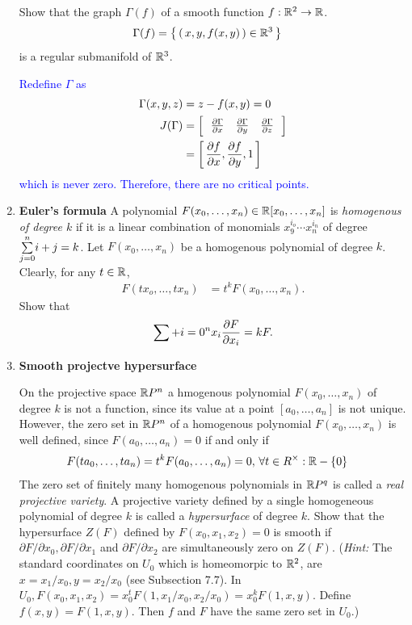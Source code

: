 \documentclass[12pt,a4paper]{report}
\newcommand{\BLUE}[1]{\textcolor{blue}{#1}}
\begin{document}
\begin{enumerate}[label=9.\arabic*.]
Show that the graph $\Gamma(f)$ of a smooth function $f: \mathbb{R}^2\to \mathbb{R}$.
\begin{align*}
	\Gamma(f) &= \left \{\, \left (\, x,y,f(x,y) \,\right ) \in \mathbb{R}^3 \,\right \}
\end{align*}is a regular submanifold of $\mathbb{R}^3$.

\BLUE{Redefine $\Gamma$ as \begin{align*}
	\Gamma(x,y,z) &= z-f(x,y) = 0\\
	J(\Gamma) &= \left [\, \begin{array}{ccc}
		\frac{\partial \Gamma}{\partial x} & \frac{\partial \Gamma}{\partial y} & \frac{\partial \Gamma}{\partial z}
	\end{array}
	 \,\right ] \\
		&= \left [\, \frac{\partial f}{\partial x},\frac{\partial f}{\partial y},1 \,\right ]
\end{align*}which is never zero.  Therefore, there are no critical points.
}

\item \textbf{Euler's formula}
A polynomial $F(x_0,\dots,x_n) \in \mathbb{R}[x_0,\dots,x_n]$ is \textit{homogenous of degree $k$} if it is a linear combination of monomials $x_9^{i_o}\cdots x_n^{i_n}$ of degree $\underset{j=0}{\overset{n}{\sum}}i+j = k$.  Let $F(x_0,\dots,x_n)$ be a homogenous polynomial of degree $k$.  Clearly, for any $t \in \mathbb{R}$,
\begin{align*}
	F(tx_o,\dots,tx_n) &= t^kF(x_0,\dots, x_n).
\end{align*}Show that
\begin{align*}
	\sum+{i=0}^n x_i\frac{\partial F}{\partial x_i} = kF.
\end{align*}

\item \textbf{Smooth projectve hypersurface}

On the projective space $\mathbb{R} P^n$ a hmogenous polynomial $F(x_0,\dots,x_n)$ of degree $k$ is not a function, since its value at a point $[a_0,\dots,a_n]$ is not unique.  However, the zero set in $\mathbb{R} P^n$ of a homogenous polynomial $F(x_0,\dots,x_n)$ is well defined, since $F(a_0,\dots,a_n)=0$ if and only if 
\begin{align*}
	F(ta_0,\dots,ta_n) &= t^kF(a_0,\dots,a_n)=0,\, \forall t \in R^\times: \mathbb{R}-\{0\}
\end{align*}The zero set of finitely many homogenous polynomials in $\mathbb{R} P^q$ is called a \textit{real projective variety}.  A projective variety defined by a single homogeneous polynomial of degree $k$ is called a \textit{hypersurface} of degree $k$.  Show that the hypersurface $Z(F)$ defined by $F(x_0,x_1,x_2)=0$ is smooth if $\partial F/\partial x_0, \partial F/\partial x_1$ and $\partial F/\partial x_2$ are simultaneously zero on $Z(F)$.  (\textit{Hint:} The standard coordinates on $U_0$ which is homeomorpic to $\mathbb{R}^2$, are $x=x_1/x_0, y=x_2/x_0$ (see Subsection 7.7).  In $U_0, F(x_0,x_1,x_2) = x_0^tF(1,x_1/x_0, x_2/x_0)= x_0^kF(1,x,y)$.  Define $f(x,y)= F(1,x,y)$.  Then $f$ and $F$ have the same zero set in $U_0$.)


\end{enumerate}
\end{document}
